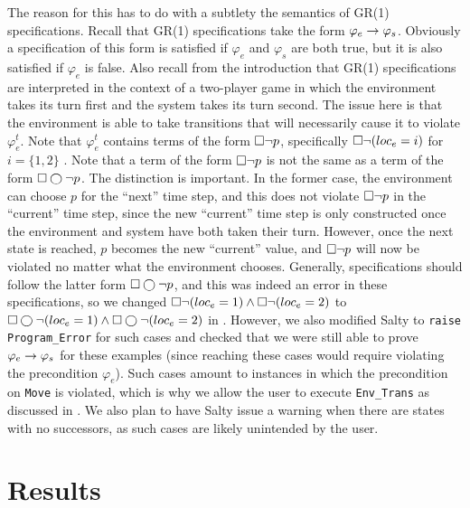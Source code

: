 \documentclass[runningheads]{llncs}
\begin{document}
The reason for this has to do with a subtlety the semantics of GR(1) specifications. 
Recall that GR(1) specifications take the form $\varphi_e \rightarrow \varphi_s$. 
Obviously a specification of this form is satisfied if $\varphi_e$ and $\varphi_s$ are both true, 
but it is also satisfied if $\varphi_e$ is false. 
Also recall from the introduction that GR(1) specifications are interpreted in the context of a two-player game 
in which the environment takes its turn first and the system takes its turn second. 
The issue here is that the environment is able to take transitions that will necessarily cause it to violate $\varphi_e^t$. 
Note that $\varphi_e^t$ contains terms of the form $\square \lnot p$, specifically $\square \lnot (loc_e = i)$ for $i = \{1, 2\}$  . 
Note that a term of the form $\square \lnot p$ is not the same as a term of the form $\square \varbigcirc \lnot p$. 
The distinction is important. 
In the former case, the environment can choose $p$ for the ``next'' time step, and this does not violate $\square \lnot p$ 
in the ``current'' time step, since the new ``current'' time step is only constructed once the environment and system have both taken their turn. 
However, once the next state is reached, $p$ becomes the new ``current'' value, and $\square \lnot p$ 
will now be violated no matter what the environment chooses.
Generally, specifications should follow the latter form $\square \varbigcirc \lnot p$, 
and this was indeed an error in these specifications, so we changed $\square \lnot (loc_e = 1) \land \square \lnot (loc_e = 2)$
 to $\square \varbigcirc \lnot (loc_e = 1) \land \square \varbigcirc \lnot (loc_e = 2)$ in .
However, we also modified Salty to \lstinline{raise Program_Error} for such cases and checked 
that we were still able to prove $\varphi_e \rightarrow \varphi_s$ for these examples  
(since reaching these cases would require violating the precondition $\varphi_e$). 
Such cases amount to instances in which the precondition on \lstinline{Move} is violated, which is why we allow the user to execute \lstinline{Env_Trans} 
as discussed in . 
We also plan to have Salty issue a warning when there are states with no successors, 
as such cases are likely unintended by the user.


\section{Results}
\label{sec:caseStudies}
\end{document}
